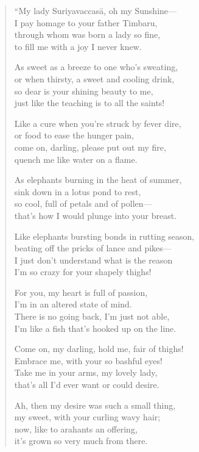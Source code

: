 \documentclass[12pt,openany]{book}%
\begin{document}
\begin{verse}%
“My lady \textsanskrit{Suriyavaccasā}, oh my Sunshine—\\
I pay homage to your father Timbaru, \\
through whom was born a lady so fine, \\
to fill me with a joy I never knew. 

As sweet as a breeze to one who’s sweating, \\
or when thirsty, a sweet and cooling drink, \\
so dear is your shining beauty to me, \\
just like the teaching is to all the saints! 

Like a cure when you’re struck by fever dire, \\
or food to ease the hunger pain, \\
come on, darling, please put out my fire, \\
quench me like water on a flame. 

As elephants burning in the heat of summer, \\
sink down in a lotus pond to rest, \\
so cool, full of petals and of pollen—\\
that’s how I would plunge into your breast. 

Like elephants bursting bonds in rutting season, \\
beating off the pricks of lance and pikes—\\
I just don’t understand what is the reason \\
I’m so crazy for your shapely thighs! 

For you, my heart is full of passion, \\
I’m in an altered state of mind. \\
There is no going back, I’m just not able, \\
I’m like a fish that’s hooked up on the line. 

Come on, my darling, hold me, fair of thighs! \\
Embrace me, with your so bashful eyes! \\
Take me in your arms, my lovely lady, \\
that’s all I’d ever want or could desire. 

Ah, then my desire was such a small thing, \\
my sweet, with your curling wavy hair; \\
now, like to arahants an offering, \\
it’s grown so very much from there. 


\end{verse}
\end{document}
